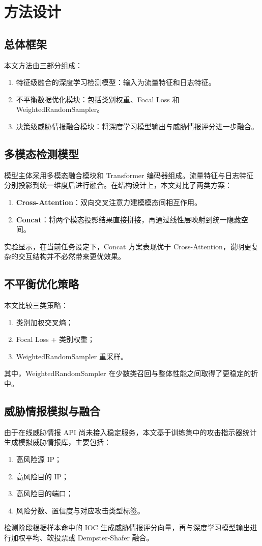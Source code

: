 \documentclass[UTF8,a4paper,12pt]{ctexart}
\begin{document}
\section{方法设计}
\subsection{总体框架}
本文方法由三部分组成：
\begin{enumerate}[leftmargin=2em]
    \item 特征级融合的深度学习检测模型：输入为流量特征和日志特征。
    \item 不平衡数据优化模块：包括类别权重、Focal Loss 和 WeightedRandomSampler。
    \item 决策级威胁情报融合模块：将深度学习模型输出与威胁情报评分进一步融合。
\end{enumerate}

\subsection{多模态检测模型}
模型主体采用多模态融合模块和 Transformer 编码器组成。流量特征与日志特征分别投影到统一维度后进行融合。在结构设计上，本文对比了两类方案：
\begin{enumerate}[leftmargin=2em]
    \item \textbf{Cross-Attention}：双向交叉注意力建模模态间相互作用。
    \item \textbf{Concat}：将两个模态投影结果直接拼接，再通过线性层映射到统一隐藏空间。
\end{enumerate}
实验显示，在当前任务设定下，Concat 方案表现优于 Cross-Attention，说明更复杂的交互结构并不必然带来更优效果。

\subsection{不平衡优化策略}
本文比较三类策略：
\begin{enumerate}[leftmargin=2em]
    \item 类别加权交叉熵；
    \item Focal Loss + 类别权重；
    \item WeightedRandomSampler 重采样。
\end{enumerate}
其中，WeightedRandomSampler 在少数类召回与整体性能之间取得了更稳定的折中。

\subsection{威胁情报模拟与融合}
由于在线威胁情报 API 尚未接入稳定服务，本文基于训练集中的攻击指示器统计生成模拟威胁情报库，主要包括：
\begin{enumerate}[leftmargin=2em]
    \item 高风险源 IP；
    \item 高风险目的 IP；
    \item 高风险目的端口；
    \item 风险分数、置信度与对应攻击类型标签。
\end{enumerate}
检测阶段根据样本命中的 IOC 生成威胁情报评分向量，再与深度学习模型输出进行加权平均、软投票或 Dempster-Shafer 融合。
\end{document}
